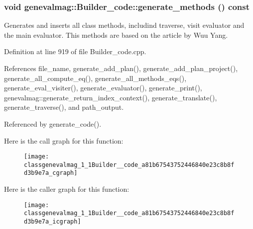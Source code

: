 \hypertarget{classgenevalmag_1_1Builder__code_a81b67543752446840e23c8b8fd3b9e7a}{
\subsubsection[{generate\_\-methods}]{\setlength{\rightskip}{0pt plus 5cm}void genevalmag::Builder\_\-code::generate\_\-methods () const}}
\label{classgenevalmag_1_1Builder__code_a81b67543752446840e23c8b8fd3b9e7a}
Generates and inserts all class methods, includind traverse, visit evaluator and the main evaluator. This methods are based on the article by Wuu Yang. 

Definition at line 919 of file Builder\_\-code.cpp.



References file\_\-name, generate\_\-add\_\-plan(), generate\_\-add\_\-plan\_\-project(), generate\_\-all\_\-compute\_\-eq(), generate\_\-all\_\-methods\_\-eqs(), generate\_\-eval\_\-visiter(), generate\_\-evaluator(), generate\_\-print(), genevalmag::generate\_\-return\_\-index\_\-context(), generate\_\-translate(), generate\_\-traverse(), and path\_\-output.



Referenced by generate\_\-code().



Here is the call graph for this function:\nopagebreak
\begin{figure}[H]
\begin{center}
\leavevmode
\texttt{[image: classgenevalmag\_1\_1Builder\_\_code\_a81b67543752446840e23c8b8fd3b9e7a\_cgraph]}
\end{center}
\end{figure}




Here is the caller graph for this function:\nopagebreak
\begin{figure}[H]
\begin{center}
\leavevmode
\texttt{[image: classgenevalmag\_1\_1Builder\_\_code\_a81b67543752446840e23c8b8fd3b9e7a\_icgraph]}
\end{center}
\end{figure}


